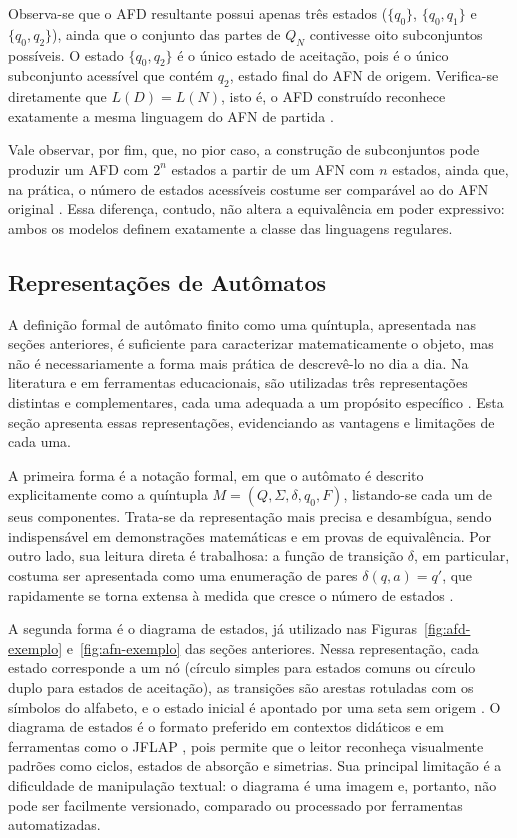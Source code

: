 \documentclass[
    12pt
    ,oneside
    ,a4paper
    ,chapter=TITLE
    ,section=TITLE
    ,sumario=abnt-6027-2012]{abntex2}
\begin{document}
Observa-se que o AFD resultante possui apenas três estados ($\{q_0\}$, $\{q_0, q_1\}$ e
$\{q_0, q_2\}$), ainda que o conjunto das partes de $Q_N$ contivesse oito subconjuntos possíveis.
O estado $\{q_0, q_2\}$ é o único estado de aceitação, pois é o único subconjunto acessível que
contém $q_2$, estado final do AFN de origem. Verifica-se diretamente que $L(D) = L(N)$, isto é,
o AFD construído reconhece exatamente a mesma linguagem do AFN de partida \cite{hopcroft2006}.

Vale observar, por fim, que, no pior caso, a construção de subconjuntos pode produzir um AFD
com $2^n$ estados a partir de um AFN com $n$ estados, ainda que, na prática, o número de estados
acessíveis costume ser comparável ao do AFN original \cite{hopcroft2006}. Essa diferença,
contudo, não altera a equivalência em poder expressivo: ambos os modelos definem exatamente a
classe das linguagens regulares.

\subsection{Representações de Autômatos}
\label{sec:representacoes_automatos}
A definição formal de autômato finito como uma quíntupla, apresentada nas seções anteriores, é
suficiente para caracterizar matematicamente o objeto, mas não é necessariamente a forma mais
prática de descrevê-lo no dia a dia. Na literatura e em ferramentas educacionais, são utilizadas
três representações distintas e complementares, cada uma adequada a um propósito específico
\cite{hopcroft2006,sipser2012}. Esta seção apresenta essas representações, evidenciando as
vantagens e limitações de cada uma.

A primeira forma é a notação formal, em que o autômato é descrito explicitamente como a
quíntupla $M = (Q, \Sigma, \delta, q_0, F)$, listando-se cada um de seus componentes. Trata-se
da representação mais precisa e desambígua, sendo indispensável em demonstrações matemáticas e
em provas de equivalência. Por outro lado, sua leitura direta é trabalhosa: a função de
transição $\delta$, em particular, costuma ser apresentada como uma enumeração de pares
$\delta(q, a) = q'$, que rapidamente se torna extensa à medida que cresce o número de estados
\cite{hopcroft2006}.

A segunda forma é o diagrama de estados, já utilizado nas Figuras~\ref{fig:afd-exemplo}
e~\ref{fig:afn-exemplo} das seções anteriores. Nessa representação, cada estado corresponde a um
nó (círculo simples para estados comuns ou círculo duplo para estados de aceitação), as
transições são arestas rotuladas com os símbolos do alfabeto, e o estado inicial é apontado por
uma seta sem origem \cite{hopcroft2006,sipser2012}. O diagrama de estados é o formato preferido
em contextos didáticos e em ferramentas como o JFLAP \cite{rodger2006jflap}, pois permite que o
leitor reconheça visualmente padrões como ciclos, estados de absorção e simetrias. Sua principal
limitação é a dificuldade de manipulação textual: o diagrama é uma imagem e, portanto, não pode
ser facilmente versionado, comparado ou processado por ferramentas automatizadas.
\end{document}
